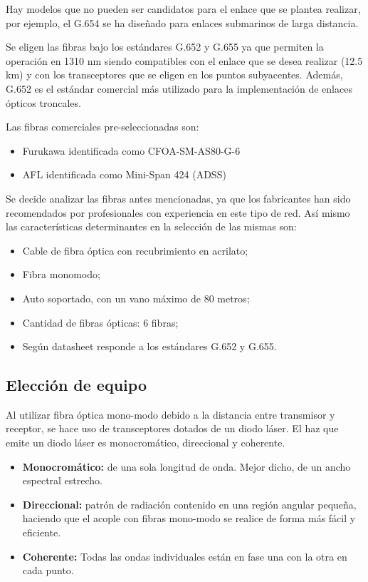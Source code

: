 \documentclass[12pt,a4paper]{book}
\begin{document}
Hay modelos que no pueden ser candidatos para el enlace que se plantea realizar, por ejemplo, el G.654 se ha diseñado para enlaces submarinos de larga distancia.

Se eligen las fibras bajo los estándares G.652 y G.655 ya que permiten la operación en 1310 nm siendo compatibles con el enlace que se desea realizar (12.5 km) y con los transceptores que se eligen en los puntos subyacentes. Además, G.652 es el estándar comercial más utilizado para la implementación de enlaces ópticos troncales.


Las fibras comerciales pre-seleccionadas son:
\begin{itemize}
\item Furukawa identificada como CFOA-SM-AS80-G-6
\item AFL identificada como Mini-Span 424 (ADSS)
\end{itemize}

Se decide analizar las fibras antes mencionadas, ya que los fabricantes han sido recomendados por profesionales con experiencia en este tipo de red. Así mismo las características determinantes en la selección de las mismas son:

\begin{itemize}
\item Cable de fibra óptica con recubrimiento en acrilato;
\item Fibra monomodo;
\item Auto soportado, con un vano máximo de 80 metros;
\item Cantidad de fibras ópticas: 6 fibras;
\item Según datasheet responde a los estándares G.652 y G.655.
\end{itemize}


\subsection{Elección de equipo}\label{subsec_eleccion_equipo_fibra}

Al utilizar fibra óptica mono-modo debido a la distancia entre transmisor y receptor, se hace uso de transceptores dotados de un diodo láser. El haz que emite un diodo láser es monocromático, direccional y coherente.

\begin{itemize}
\item \textbf{Monocromático:} de una sola longitud de onda. Mejor dicho, de un ancho espectral estrecho.
\item \textbf{Direccional:} patrón de radiación contenido en una región angular pequeña, haciendo que el acople con fibras mono-modo se realice de forma más fácil y eficiente.
\item \textbf{Coherente:} Todas las ondas individuales están en fase una con la otra en cada punto.
\end{itemize}
\end{document}
